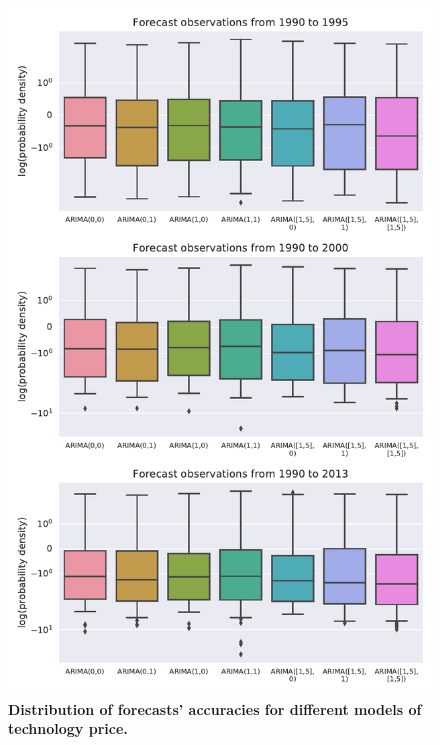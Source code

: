 \documentclass{article}
\begin{document}
\begin{figure}
    \centering
    \includegraphics[height=.75\textheight]{figs/Separate_Models_Forecast_Quality_Price.pdf}
    \caption{\textbf{Distribution of forecasts' accuracies for different models of technology price.}}
    \label{fig:Separate_Models_Forecast_Quality_Price}
\end{figure}
\end{document}
